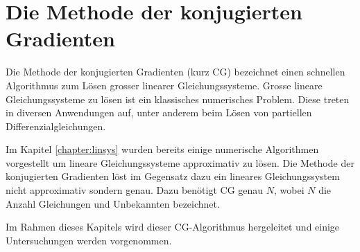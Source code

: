 %
%
%
\chapter{Die Methode der konjugierten Gradienten\label{chapter:cg}}
\begin{refsection}

Die Methode der konjugierten Gradienten (kurz CG) bezeichnet einen schnellen Algorithmus zum Lösen grosser linearer Gleichungssysteme.
Grosse lineare Gleichungssysteme zu lösen ist ein klassisches numerisches Problem.
Diese treten in diversen Anwendungen auf, unter anderem beim Lösen von partiellen Differenzialgleichungen.

Im Kapitel \ref{chapter:linsys} wurden bereits einige numerische Algorithmen vorgestellt um lineare Gleichungssysteme approximativ zu lösen.
Die Methode der konjugierten Gradienten löst im Gegensatz dazu ein lineares Gleichungssystem nicht approximativ sondern genau.
Dazu benötigt CG genau $N$, wobei $N$ die Anzahl Gleichungen und Unbekannten bezeichnet.

Im Rahmen dieses Kapitels wird dieser CG-Algorithmus hergeleitet und einige Untersuchungen werden vorgenommen.





\printbibliography[heading=subbibliography]
\end{refsection}
